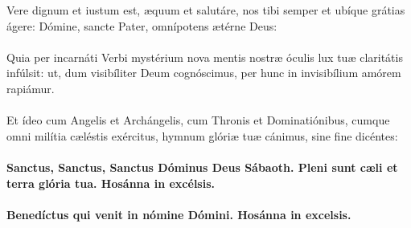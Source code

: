 \documentclass[12pt, a4paper]{article}
\begin{document}
	\\
	\\
	\\
	\\
	\\
	Vere dignum et iustum est, æquum
	et salutáre, nos tibi semper et
	ubíque grátias ágere: Dómine,
	sancte Pater, omnípotens ætérne
	Deus:
	\\\\
	Quia per incarnáti Verbi mystérium
	nova mentis nostræ óculis lux tuæ
	claritátis infúlsit: ut, dum visibíliter
	Deum cognóscimus, per hunc in
	invisibílium amórem rapiámur.
	\\\\
	Et ídeo cum Angelis et
	Archángelis, cum Thronis et
	Dominatiónibus, cumque omni
	milítia cæléstis exércitus, hymnum
	glóriæ tuæ cánimus, sine fine
	dicéntes:
	\\\\
	\textbf{Sanctus, Sanctus, Sanctus Dóminus
		Deus Sábaoth. Pleni sunt cæli et
		terra glória tua. Hosánna in
		excélsis.}
	\\\\
	\textbf{Benedíctus qui venit in nómine
		Dómini. Hosánna in excelsis.}
	
	\newpage
	
\end{document}
